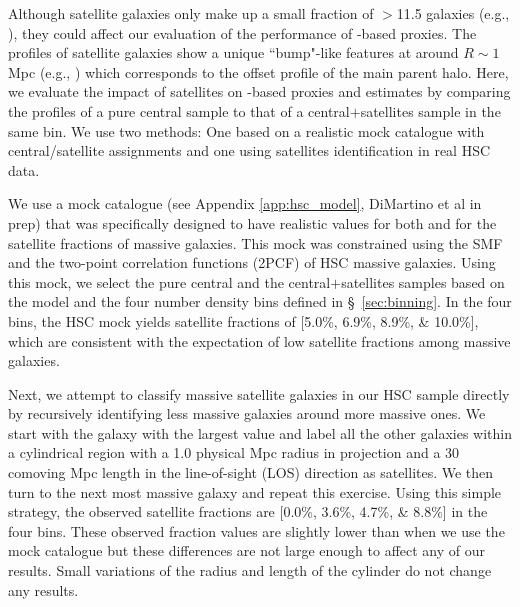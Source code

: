 \documentclass[fleqn,usenatbib,useAMS]{mnras}
\begin{document}
\begin{CJK*}{UTF8}{gbsn}
    Although satellite galaxies only make up a small fraction of $>$11.5 galaxies
    (e.g., \citealt{Reid2014, Saito2016, vanUitert2016, Huang2020}), they could affect our
    evaluation of the performance of \mstar{}-based \mvir{} proxies. 
    The \dsigma{} profiles of satellite galaxies show a unique ``bump"-like features at around $R
    \sim 1$ Mpc (e.g., \citealt{LiShan2014, LiShan2016, Sifon2015, Sifon2018}) which corresponds to
    the offset profile of the main parent halo. 
    Here, we evaluate the impact of satellites on \mstar{}-based proxies and \sigmh{} estimates by
    comparing the \dsigma{} profiles of a pure central sample to that of a central$+$satellites
    sample in the same \topn{} bin. 
    We use two methods: One based on a realistic mock catalogue with central/satellite assignments and
    one using satellites identification in real HSC data.
    
    We use a mock catalogue (see Appendix \ref{app:hsc_model}, DiMartino et al in prep) that was
    specifically designed to have realistic values for both \scatterMhaloObsSym{} and for the
    satellite fractions of massive galaxies. 
    This mock was constrained using the SMF and the two-point correlation functions (2PCF) of HSC
    massive galaxies.
    Using this mock, we select the pure central and the central$+$satellites samples based on 
    the model \mstar{} and the four number density bins defined in \S\ \ref{sec:binning}.
    In the four \topn{} bins, the HSC mock yields satellite fractions of [5.0\%, 6.9\%,
    8.9\%, \& 10.0\%], which are consistent with the expectation of low satellite fractions 
    among massive galaxies.
    
    Next, we attempt to classify massive satellite galaxies in our HSC sample directly by recursively
    identifying less massive galaxies around more massive ones.
    We start with the galaxy with the largest \mstar{} value and label all the other galaxies within
    a cylindrical region with a 1.0 physical Mpc radius in projection and a 30 comoving Mpc length
    in the line-of-sight (LOS) direction as satellites. 
    We then turn to the next most massive galaxy and repeat this exercise. 
    Using this simple strategy, the observed satellite fractions are [0.0\%, 3.6\%, 4.7\%, \& 8.8\%]
    in the four \topn{} bins. 
    These observed fraction values are slightly lower than when we use the mock catalogue but these
    differences are not large enough to affect any of our results. 
    Small variations of the radius and length of the cylinder do not change any results.


\end{CJK*}
\end{document}
